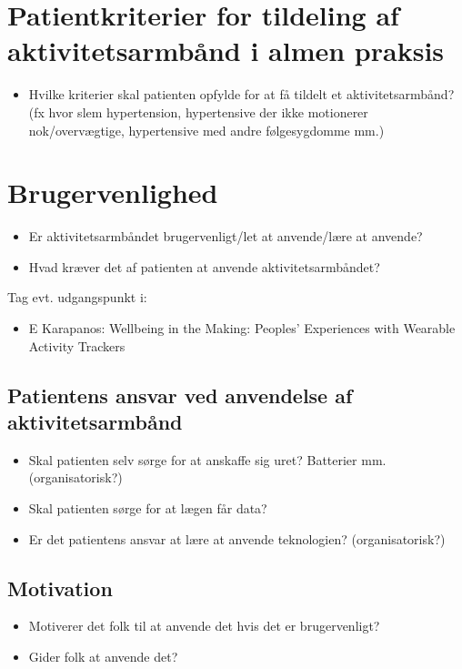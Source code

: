 \section{Patientkriterier for tildeling af aktivitetsarmbånd i almen praksis}
\begin{itemize}
\item Hvilke kriterier skal patienten opfylde for at få tildelt et aktivitetsarmbånd? (fx hvor slem hypertension, hypertensive der ikke motionerer nok/overvægtige, hypertensive med andre følgesygdomme mm.)
\end{itemize}

\section{Brugervenlighed}
\begin{itemize}
\item Er aktivitetsarmbåndet brugervenligt/let at anvende/lære at anvende?
\item Hvad kræver det af patienten at anvende aktivitetsarmbåndet?
\end{itemize}
Tag evt. udgangspunkt i: 
\begin{itemize}
\item E Karapanos: Wellbeing in the Making: Peoples' Experiences with Wearable Activity Trackers
\end{itemize}

\subsection{Patientens ansvar ved anvendelse af aktivitetsarmbånd}
\begin{itemize}
\item Skal patienten selv sørge for at anskaffe sig uret? Batterier mm. (organisatorisk?)
\item Skal patienten sørge for at lægen får data?
\item Er det patientens ansvar at lære at anvende teknologien? (organisatorisk?)
\end{itemize}

\subsection{Motivation}
\begin{itemize}
\item Motiverer det folk til at anvende det hvis det er brugervenligt?
\item Gider folk at anvende det?
\end{itemize}


